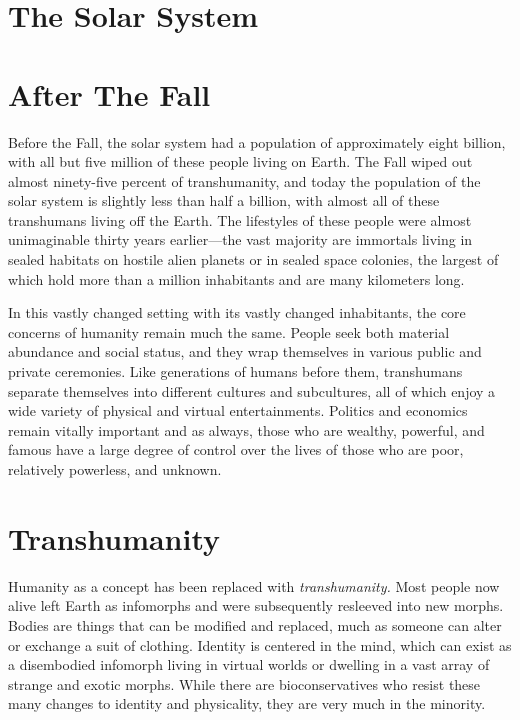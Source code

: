 \section{The Solar System }


\section{After The Fall}

Before the Fall, the solar system had a population of 
approximately eight billion, with all but five million 
of these people living on Earth. The Fall wiped out 
almost ninety-five percent of transhumanity, and 
today the population of the solar system is slightly less 
than half a billion, with almost all of these transhumans living off the Earth. The lifestyles of these people 
were almost unimaginable thirty years earlier—the 
vast majority are immortals living in sealed habitats 
on hostile alien planets or in sealed space colonies, the 
largest of which hold more than a million inhabitants 
and are many kilometers long.

In this vastly changed setting with its vastly 
changed inhabitants, the core concerns of humanity 
remain much the same. People seek both material 
abundance and social status, and they wrap themselves in various public and private ceremonies. Like 
generations of humans before them, transhumans 
separate themselves into different cultures and subcultures, all of which enjoy a wide variety of physical 
and virtual entertainments. Politics and economics 
remain vitally important and as always, those who are 
wealthy, powerful, and famous have a large degree of 
control over the lives of those who are poor, relatively 
powerless, and unknown.

\section{Transhumanity}

Humanity as a concept has been replaced with 
\textit{transhumanity.} Most people now alive left Earth as 
infomorphs and were subsequently resleeved into new 
morphs. Bodies are things that can be modified and 
replaced, much as someone can alter or exchange a 
suit of clothing. Identity is centered in the mind, which 
can exist as a disembodied infomorph living in virtual worlds or dwelling in a vast array of strange and 
exotic morphs. While there are bioconservatives who 
resist these many changes to identity and physicality, 
they are very much in the minority.

